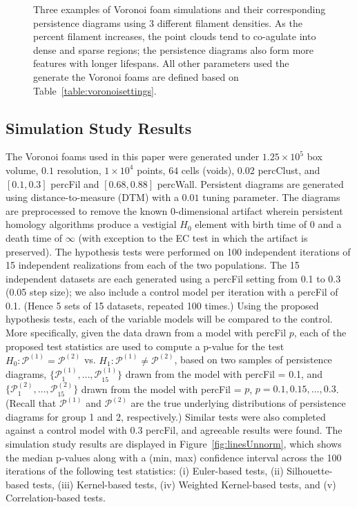 \documentclass[12pt]{article}
\newcommand{\figref}[1]{Figure~\ref{#1}}
\begin{document}
\begin{center}
\begin{figure}[htp!]
\begin{subfigure}{.32\textwidth}
      \label{fig:percfil09pd}
    \end{subfigure}
      \caption{Three examples of Voronoi foam simulations and their corresponding persistence diagrams using 3 different filament densities. As the percent filament increases, the point clouds tend to co-agulate into dense and sparse regions; the persistence diagrams also form more features with longer lifespans. All other parameters used the generate the Voronoi foams are defined based on Table~\ref{table:voronoisettings}.}
      \label{fig:percfilexample}
  \end{figure}
\end{center}

\subsection{Simulation Study Results}
\label{sec:results1}
The Voronoi foams used in this paper were generated under $1.25 \times  10^{5}$ box volume, $0.1$ resolution, $1 \times  10^{4}$ points, $64$ cells (voids), 0.02 percClust, and $[0.1, 0.3]$ percFil and $[0.68, 0.88]$ percWall. Persistent diagrams are generated using distance-to-measure (DTM) with a $0.01$ tuning parameter. The diagrams are preprocessed to remove the known 0-dimensional artifact wherein persistent homology algorithms produce a vestigial $H_{0}$ element with birth time of 0 and a death time of $\infty$ (with exception to the EC test in which the artifact is preserved). The hypothesis tests were performed on 100 independent iterations of 15 independent realizations from each of the two populations. The 15 independent datasets are each generated using a percFil setting from 0.1 to 0.3 (0.05 step size); we also include a control model per iteration with a percFil of 0.1. (Hence 5 sets of 15 datasets, repeated 100 times.) Using the proposed hypothesis tests, each of the variable models will be compared to the control. More specifically, given the data drawn from a model with percFil $p$, each of the proposed test statistics are used to compute a p-value for the test $H_0: \mathcal
P^{(1)} = \mathcal P^{(2)}$ vs. $H_1: \mathcal P^{(1)} \neq \mathcal P^{(2)}$,
based on two samples of persistence diagrams, $\{\mathcal
P_1^{(1)}, \ldots, \mathcal P_{15}^{(1)}\}$ drawn from the model with percFil = 0.1, and $\{\mathcal P_1^{(2)}, \ldots,
\mathcal P_{15}^{(2)}\}$ drawn from the model with percFil = $p$, $p = 0.1, 0.15, \ldots, 0.3$.
(Recall that $\mathcal P^{(1)}$ and $\mathcal P^{(2)}$ are the true underlying
distributions of persistence diagrams for group 1 and 2, respectively.)
Similar tests were also completed against a control model with 0.3 percFil, and agreeable results were found. The simulation study results are displayed in \figref{fig:linesUnnorm}, which shows the median p-values along with a (min, max) confidence interval across the 100 iterations of the following test statistics: (i) Euler-based tests, (ii) Silhouette-based tests, (iii) Kernel-based tests, (iv) Weighted Kernel-based tests, and (v) Correlation-based tests.
\end{document}
